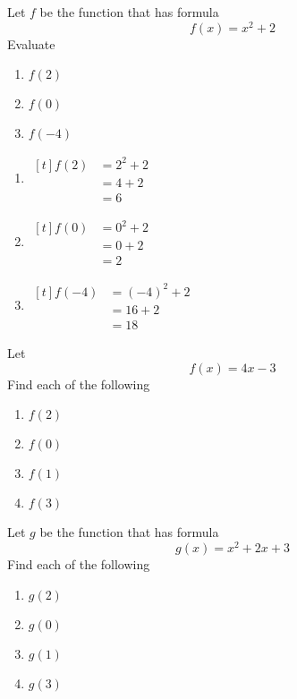 \begin{myexample}
Let $f$ be the function that has formula
\[
	f(x)=x^2+2
\]
Evaluate 
\begin{multicols}{3}
	\begin{enumerate}
		\item $f(2)$
		\item $f(0)$
		\item $f(-4)$
	\end{enumerate} 
\end{multicols}
\end{myexample}
\begin{myProof}
	\begin{enumerate}
		\item 
		$\begin{aligned}[t]
			f(2) & =		2^2+2 \\
			     & =		4+2   \\
			     & =		6     
		\end{aligned}$
		\item 
		$\begin{aligned}[t]
			f(0) & =		0^2+2 \\
			     & =		0+2   \\
			     & =		2     
		\end{aligned}$
		\item 
		$\begin{aligned}[t]
			f(-4) & =		(-4)^2+2 \\
			      & =		16+2     \\
			      & =		18       
		\end{aligned}$
	\end{enumerate} 
\end{myProof} 

\begin{myexample}
\drillandskill
Let
\[
	f(x) = 4x-3
\]
Find each of the following
\begin{multicols}{4}
	\begin{enumerate}
		\item $f(2)$ 
		\item $f(0)$
		\item $f(1)$
		\item $f(3)$
	\end{enumerate}
\end{multicols}
\end{myexample}

\begin{myexample}
\drillandskill
Let $g$ be the function that has formula
\[
	g(x) = x^2 + 2x +3 
\]
Find each of the following
\begin{multicols}{4}
	\begin{enumerate}
		\item $g(2)$
		\item $g(0)$
		\item $g(1)$
		\item $g(3)$
	\end{enumerate}
\end{multicols}
\end{myexample}


